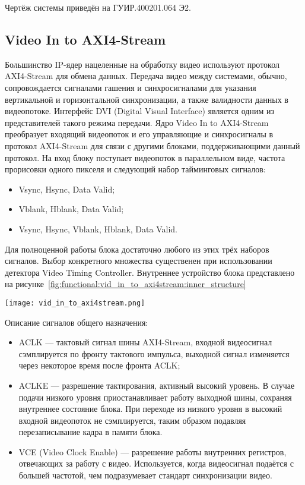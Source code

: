 Чертёж системы приведён на ГУИР.400201.064 Э2.

\subsection{Video In to AXI4-Stream}
\label{sec:functional:video_in_to_axi4stream}
Большинство IP-ядер нацеленные на обработку видео используют протокол AXI4-Stream для
обмена данных. Передача видео между системами, обычно, сопровождается сигналами гашения и
синхросигналами для указания вертикальной и горизонтальной синхронизации, а также
валидности данных в видеопотоке. Интерфейс DVI (Digital Visual Interface) является
одним из представителей такого режима передачи. Ядро Video In to AXI4-Stream преобразует
входящий видеопоток и его управляющие и синхросигналы в протокол AXI4-Stream для
связи с другими блоками, поддерживающими данный протокол. На вход блоку поступает
видеопоток в параллельном виде, частота прорисовки одного пикселя и следующий набор
тайминговых сигналов:

\begin{itemize}
  \item Vsync, Hsync, Data Valid;
  \item Vblank, Hblank, Data Valid;
  \item Vsync, Hsync, Vblank, Hblank, Data Valid.
\end{itemize}

Для полноценной работы блока достаточно любого из этих трёх наборов сигналов. Выбор конкретного
множества существенен при использовании детектора Video Timing Controller.
Внутреннее устройство блока представлено на рисунке~\ref{fig:functional:vid_in_to_axi4stream:inner_structure}

\begin{center}
  \centering
  \texttt{[image: vid\_in\_to\_axi4stream.png]}
  \label{fig:functional:vid_in_to_axi4stream:inner_structure}
\end{center}

Описание сигналов общего назначения:

\begin{itemize}
  \item ACLK --- тактовый сигнал шины AXI4-Stream, входной видеосигнал сэмплируется по фронту
    тактового импульса, выходной сигнал  изменяется через некоторое время после фронта ACLK;
  \item ACLKE --- разрешение тактирования, активный высокий уровень. В случае подачи низкого уровня
    приостанавливает работу выходной шины, сохраняя внутреннее состояние блока. При переходе
    из низкого уровня в высокий входной видеопоток не сэмплируется, таким образом подавляя перезаписывание
    кадра в памяти блока.
  \item VCE (Video Clock Enable) --- разрешение работы внутренних регистров, отвечающих за работу с видео.
    Используется, когда видеосигнал подаётся с большей частотой, чем подразумевает стандарт синхронизации видео.
\end{itemize}

